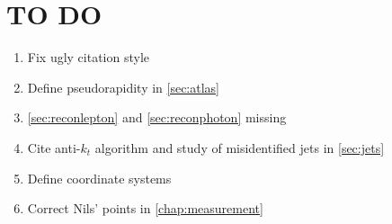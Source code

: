 \chapter{TO DO}
\begin{enumerate}
    \item Fix ugly citation style
    \item Define pseudorapidity in \ref{sec:atlas}
    \item \ref{sec:reconlepton} and \ref{sec:reconphoton} missing
    \item Cite anti-$k_t$ algorithm and study of misidentified jets in \ref{sec:jets}
    \item Define coordinate systems
    \item Correct Nils' points in \ref{chap:measurement}
\end{enumerate}